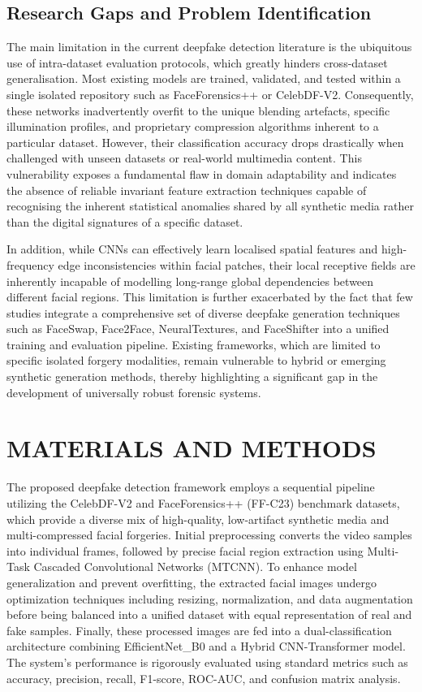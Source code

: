 \documentclass[12pt,a4paper]{report}
\begin{document}
\section{Research Gaps and Problem Identification}
The main limitation in the current deepfake detection literature is the ubiquitous use of intra-dataset evaluation protocols, which greatly hinders cross-dataset generalisation. Most existing models are trained, validated, and tested within a single isolated repository such as FaceForensics++ or CelebDF-V2. Consequently, these networks inadvertently overfit to the unique blending artefacts, specific illumination profiles, and proprietary compression algorithms inherent to a particular dataset. However, their classification accuracy drops drastically when challenged with unseen datasets or real-world multimedia content. This vulnerability exposes a fundamental flaw in domain adaptability and indicates the absence of reliable invariant feature extraction techniques capable of recognising the inherent statistical anomalies shared by all synthetic media rather than the digital signatures of a specific dataset.

In addition, while CNNs can effectively learn localised spatial features and high-frequency edge inconsistencies within facial patches, their local receptive fields are inherently incapable of modelling long-range global dependencies between different facial regions. This limitation is further exacerbated by the fact that few studies integrate a comprehensive set of diverse deepfake generation techniques such as FaceSwap, Face2Face, NeuralTextures, and FaceShifter into a unified training and evaluation pipeline. Existing frameworks, which are limited to specific isolated forgery modalities, remain vulnerable to hybrid or emerging synthetic generation methods, thereby highlighting a significant gap in the development of universally robust forensic systems.

\chapter{MATERIALS AND METHODS}
The proposed deepfake detection framework employs a sequential pipeline utilizing the CelebDF-V2 and FaceForensics++ (FF-C23) benchmark datasets, which provide a diverse mix of high-quality, low-artifact synthetic media and multi-compressed facial forgeries. Initial preprocessing converts the video samples into individual frames, followed by precise facial region extraction using Multi-Task Cascaded Convolutional Networks (MTCNN). To enhance model generalization and prevent overfitting, the extracted facial images undergo optimization techniques including resizing, normalization, and data augmentation before being balanced into a unified dataset with equal representation of real and fake samples. Finally, these processed images are fed into a dual-classification architecture combining EfficientNet\_B0 and a Hybrid CNN-Transformer model. The system's performance is rigorously evaluated using standard metrics such as accuracy, precision, recall, F1-score, ROC-AUC, and confusion matrix analysis.
\end{document}
